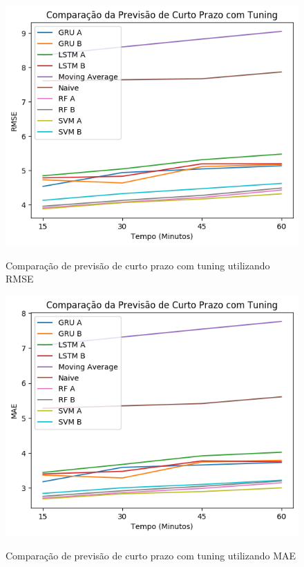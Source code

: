 
\begin{figure}[htbp]
    \centering
    \includegraphics[scale=0.8]{monography/img/comparisons/comparacao_da_previsao_de_curto_prazo_com_tuning_rmse.png}
    \label{figure:previsao_de_curto_prazo_com_tuning_rmse}
    \caption{Comparação de previsão de curto prazo com tuning utilizando RMSE}
\end{figure}

\begin{figure}[htbp]
    \centering
    \includegraphics[scale=0.8]{monography/img/comparisons/comparacao_da_previsao_de_curto_prazo_com_tuning_mae.png}
    \label{figure:previsao_de_curto_prazo_com_tuning_mae}
    \caption{Comparação de previsão de curto prazo com tuning utilizando MAE}
\end{figure}

